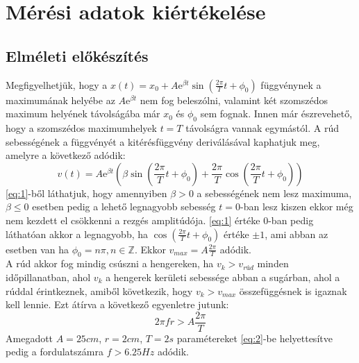 \documentclass[10pt,pdftex]{report}
\begin{document}
\section*{Mérési adatok kiértékelése}
\subsection*{Elméleti előkészítés}
Megfigyelhetjük, hogy a $x(t)=x_0+A\mathrm{e}^{\beta t}\sin\left(\frac{2\pi}{T}t+\phi_0\right)$ függvénynek a maximumának helyébe az $A\mathrm{e}^{\beta t}$ nem fog beleszólni, 
valamint két szomszédos maximum helyének távolságába már $x_0$ és $\phi_0$ sem fognak. Innen már észrevehető, hogy a szomszédos maximumhelyek $t=T$ távolságra vannak egymástól.
\newline
A rúd sebességének a függvényét a kitérésfüggvény deriválásával kaphatjuk meg, amelyre a következő adódik:
\begin{equation}
    v(t)=A\mathrm{e}^{\beta t}\left(\beta\sin\left(\frac{2\pi}{T}t+\phi_0\right)+\frac{2\pi}{T}\cos\left(\frac{2\pi}{T}t+\phi_0\right)\right) \label{eq:1}
\end{equation}
\eqref{eq:1}-ből láthatjuk, hogy amennyiben $\beta>0$ a sebességének nem lesz maximuma, $\beta\leq 0$ esetben pedig a lehető legnagyobb sebesség $t=0$-ban lesz 
kiszen ekkor még nem kezdett el csökkenni a rezgés amplitúdója. \eqref{eq:1} értéke 0-ban pedig láthatóan akkor a legnagyobb, ha $\cos\left(\frac{2\pi}{T}t+\phi_0\right)$ 
értéke $\pm 1$, ami abban az esetben van ha $\phi_0=n\pi, n\in\mathds{Z}$. Ekkor $v_{max}=A\frac{2\pi}{T}$ adódik.\\A rúd akkor fog mindig csúszni a hengereken, ha 
$v_k>v_{rúd}$ minden időpillanatban, ahol $v_k$ a hengerek kerületi sebessége abban a sugárban, ahol a rúddal érintkeznek, amiből következik, hogy $v_k>v_{max}$ összefüggésnek is igaznak kell lennie. 
Ezt átírva a következő egyenletre jutunk:
\begin{equation}
    2\pi fr>A\frac{2\pi}{T} \label{eq:2}
\end{equation}
Amegadott $A=25cm$, $r=2cm$, $T=2s$ paramétereket \eqref{eq:2}-be helyettesítve pedig a fordulatszámra $f>6.25Hz$ adódik.
\end{document}
